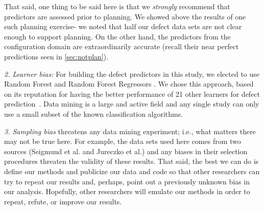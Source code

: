 \documentclass[conference]{IEEEtran}
\newcommand{\tion}[1]{\textsection\ref{sec:#1}}
\begin{document}
That said, one thing to be said here
is that we {\em strongly} recommend that predictors are assessed prior to planning.
We showed above the results of one such planning exercise- we noted that half
our defect data sets are not clear enough to support planning. On the other hand,
the predictors from the configuration domain are extraordinarily accurate (recall
their near perfect predictions seen in \tion{notplan}).

 
{\em 2. Learner bias: } For building the defect predictors in this study, we elected
to use  Random Forest  and Random Forest Regressors .
We chose this approach,  based on its reputation for having the better  performance of 
21 other learners for defect prediction~\cite{lessmann}.
Data mining is a
large and active field and any single study can only use a small
subset of the known classification algorithms.  


{\em 3. Sampling bias} threatens any data mining experiment; i.e., what matters
there may not be true here. For example, the data sets used here comes from two sources
(Seigmund et al. and Jureczko et al.) and any biases in their selection procedures
threaten the validity of these results. 
That said,
the best we can do is define our methods and publicize our data and code so that other researchers can
try to repeat our results and, perhaps, point out a previously unknown bias
in our analysis. Hopefully, other researchers will emulate our methods in
order to repeat, refute, or improve our results. 



 


\end{document}
